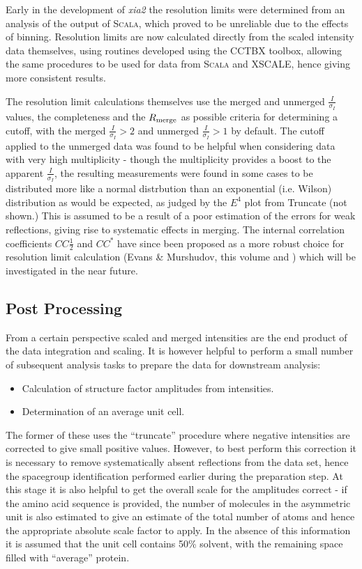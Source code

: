 \documentclass[a4paper, 11pt]{article}
\begin{document}
Early in the development of \emph{xia2} the resolution limits were
determined from an analysis of the output of \textsc{Scala}, which proved to be
unreliable due to the effects of binning. 
Resolution limits are now calculated directly from the
scaled intensity data themselves, using routines developed using
the CCTBX toolbox, allowing the same procedures to be used for data
from \textsc{Scala} and XSCALE, hence giving more consistent results.

The resolution limit calculations themselves use the merged and
unmerged $\frac{I}{\sigma_I}$ values, the completeness and the
$R_{\rm{merge}}$ as possible criteria for determining a cutoff, with
the merged $\frac{I}{\sigma_I} > 2$ and unmerged 
$\frac{I}{\sigma_I}> 1$ by default. The cutoff applied to the unmerged
data was found to be 
helpful when considering data with very high multiplicity - though the
multiplicity provides a boost to the apparent $\frac{I}{\sigma_I}$,
the resulting measurements were found in some cases
to be distributed more like a
normal distrbution than an exponential (i.e. Wilson) distribution as
would be
expected, as judged by the $E^4$ plot from Truncate (not shown.)
This is assumed
to be a result of a poor estimation of the errors for weak
reflections, giving rise to systematic effects in
merging. The internal correlation coefficients $CC\frac{1}{2}$ and $CC^*$
have since been proposed as a more robust
choice for resolution limit calculation (Evans \& Murshudov, this
volume and \cite{Karplus25052012})
which will be investigated in the near future.

\subsection{Post Processing}

From a certain perspective scaled and merged intensities are the end
product of the data integration and scaling. It is however helpful to
perform a small number of subsequent analysis tasks to prepare the
data for downstream analysis:

\begin{itemize}
\item{Calculation of structure factor amplitudes from intensities.}
\item{Determination of an average unit cell.}
\end{itemize}

\noindent
The former of these uses the ``truncate'' procedure \cite{French:a15572}
where negative intensities are corrected to give small positive
values. However, to best perform this correction it is necessary to
remove systematically absent reflections from the data set, hence the
spacegroup identification performed earlier during the preparation
step. At this stage it is also helpful to get the overall scale for
the amplitudes correct - if the amino acid sequence is provided, the
number of molecules in the asymmetric unit is also
estimated \cite{KantardjieffRupp}
to give an estimate of the total number of atoms
and hence the appropriate absolute
scale factor to apply. In the absence of
this information it is assumed that the unit cell contains 50\%
solvent, with the remaining space filled with ``average'' protein. 
\end{document}
